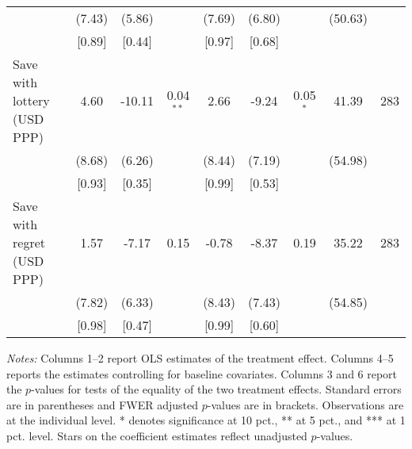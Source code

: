 \begin{table}[h]
{\begin{threeparttable}
\begin{tabular}{l*{8}{c}}
          &   (7.43)&   (5.86)&         &   (7.69)&   (6.80)&         &  (50.63)&         \\
          &   [0.89]&   [0.44]&         &   [0.97]&   [0.68]&         &         &         \\
Save with lottery (USD PPP)&     4.60&   -10.11&0.04$^{**}$&     2.66&    -9.24&0.05$^{*}$&    41.39&      283\\
          &   (8.68)&   (6.26)&         &   (8.44)&   (7.19)&         &  (54.98)&         \\
          &   [0.93]&   [0.35]&         &   [0.99]&   [0.53]&         &         &         \\
Save with regret (USD PPP)&     1.57&    -7.17&     0.15&    -0.78&    -8.37&     0.19&    35.22&      283\\
          &   (7.82)&   (6.33)&         &   (8.43)&   (7.43)&         &  (54.85)&         \\
          &   [0.98]&   [0.47]&         &   [0.99]&   [0.60]&         &         &         \\
\bottomrule \end{tabular} \begin{tablenotes}[flushleft] \footnotesize \item \emph{Notes:} Columns 1--2 report OLS estimates of the treatment effect. Columns 4--5 reports the estimates controlling for baseline covariates. Columns 3 and 6 report the \(p\)-values for tests of the equality of the two treatment effects. Standard errors are in parentheses and FWER adjusted \(p\)-values are in brackets. Observations are at the individual level. * denotes significance at 10 pct., ** at 5 pct., and *** at 1 pct. level. Stars on the coefficient estimates reflect unadjusted \(p\)-values. \end{tablenotes} \end{threeparttable} } \end{table}

